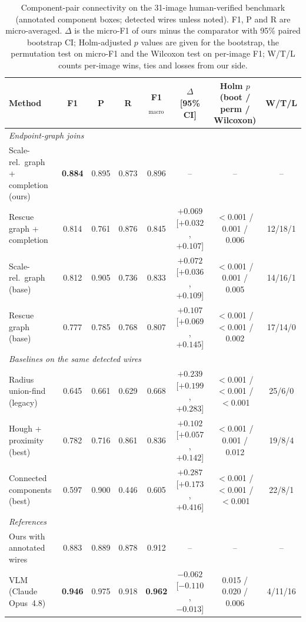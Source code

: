 \documentclass[journal]{IEEEtran}
\begin{document}
\begin{table}[t]
\caption{Component-pair connectivity on the 31-image human-verified benchmark (annotated component boxes; detected wires unless noted). F1, P and R are micro-averaged. {$\Delta$} is the micro-F1 of ours minus the comparator with 95\% paired bootstrap CI; Holm-adjusted $p$ values are given for the bootstrap, the permutation test on micro-F1 and the Wilcoxon test on per-image F1; W/T/L counts per-image wins, ties and losses from our side.}
\label{tab:real_join}
\centering
\footnotesize
\setlength{\tabcolsep}{4pt}
\begin{tabular}{lccccccc}
\toprule
\textbf{Method} & \textbf{F1} & \textbf{P} & \textbf{R} & \textbf{F1$_{\text{macro}}$} & \textbf{$\Delta$ [95\% CI]} & \textbf{Holm $p$ (boot / perm / Wilcoxon)} & \textbf{W/T/L} \\
\midrule
\multicolumn{8}{l}{\emph{Endpoint-graph joins}} \\
Scale-rel.\ graph + completion (ours) & \textbf{0.884} & 0.895 & 0.873 & 0.896 & -- & -- & -- \\
Rescue graph + completion & 0.814 & 0.761 & 0.876 & 0.845 & $+0.069$ [$+0.032$, $+0.107$] & $<$0.001 / 0.001 / 0.006 & 12/18/1 \\
Scale-rel.\ graph (base) & 0.812 & 0.905 & 0.736 & 0.833 & $+0.072$ [$+0.036$, $+0.109$] & $<$0.001 / 0.001 / 0.005 & 14/16/1 \\
Rescue graph (base) & 0.777 & 0.785 & 0.768 & 0.807 & $+0.107$ [$+0.069$, $+0.145$] & $<$0.001 / $<$0.001 / 0.002 & 17/14/0 \\
\midrule
\multicolumn{8}{l}{\emph{Baselines on the same detected wires}} \\
Radius union-find (legacy) & 0.645 & 0.661 & 0.629 & 0.668 & $+0.239$ [$+0.199$, $+0.283$] & $<$0.001 / $<$0.001 / $<$0.001 & 25/6/0 \\
Hough + proximity (best) & 0.782 & 0.716 & 0.861 & 0.836 & $+0.102$ [$+0.057$, $+0.142$] & $<$0.001 / 0.001 / 0.012 & 19/8/4 \\
Connected components (best) & 0.597 & 0.900 & 0.446 & 0.605 & $+0.287$ [$+0.173$, $+0.416$] & $<$0.001 / $<$0.001 / $<$0.001 & 22/8/1 \\
\midrule
\multicolumn{8}{l}{\emph{References}} \\
Ours with annotated wires & 0.883 & 0.889 & 0.878 & 0.912 & -- & -- & -- \\
VLM (Claude Opus~4.8) & \textbf{0.946} & 0.975 & 0.918 & \textbf{0.962} & $-0.062$ [$-0.110$, $-0.013$] & 0.015 / 0.020 / 0.006 & 4/11/16 \\
\bottomrule
\end{tabular}
\end{table}
\end{document}
